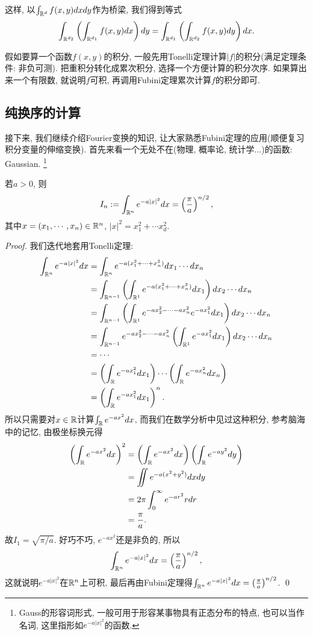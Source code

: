 这样, 以$\int_{\mathbb{R}^d} f(x,y) dxdy$作为桥梁, 我们得到等式
$$\int_{\mathbb{R}^{d_2}} \left(\int_{\mathbb{R}^{d_1}}f(x,y)dx\right)dy
  =\int_{\mathbb{R}^{d_1}} \left(\int_{\mathbb{R}^{d_2}}f(x,y)dy\right)dx.$$
\begin{remark}
    假如要算一个函数$f(x,y)$的积分, 一般先用Tonelli定理计算$|f|$的积分(满足定理条件: 非负可测).
    把重积分转化成累次积分, 选择一个方便计算的积分次序. 
    如果算出来一个有限数, 就说明$f$可积, 再调用Fubini定理累次计算$f$的积分即可.
\end{remark}

\subsection{纯换序的计算}
接下来, 我们继续介绍Fourier变换的知识, 让大家熟悉Fubini定理的应用(顺便复习积分变量的伸缩变换). 首先来看一个无处不在(物理, 概率论, 统计学...)的函数: Gaussian.
\footnote{Gauss的形容词形式, 一般可用于形容某事物具有正态分布的特点, 也可以当作名词, 这里指形如$e^{-a|x|^2}$的函数.}
\begin{example}[~(Gaussian)]
    若$a>0$, 则
    $$I_n := \int_{\mathbb{R}^n}e^{-a|x|^2}dx = \left(\frac{\pi}{a}\right)^{n/2},$$
    其中$x=(x_1, \cdots, x_n) \in \mathbb{R}^n$, $|x|^2 = x_1^2 + \cdots x_d^2$.
\end{example}
\begin{proof}
    我们迭代地套用Tonelli定理:
    \begin{align*}
    \int_{\mathbb{R}^n}e^{-a|x|^2}dx 
    &= \int_{\mathbb{R}^n}e^{-a(x_1^2+\cdots+x_n^2)} dx_1 \cdots dx_n \\
    &= \int_{\mathbb{R}^{n-1}}\left(\int_{\mathbb{R}^1}e^{-a(x_1^2+\cdots+x_n^2)}dx_1 \right)dx_2 \cdots dx_n \\
    &= \int_{\mathbb{R}^{n-1}}\left(\int_{\mathbb{R}^1}e^{-ax_2^2-\cdots-ax_n^2}e^{-ax_1^2}dx_1\right) 
       dx_2 \cdots dx_n \\
    &= \int_{\mathbb{R}^{n-1}}e^{-ax_2^2-\cdots-ax_n^2} \left(\int_{\mathbb{R}^1}e^{-ax_1^2}dx_1\right) 
       dx_2 \cdots dx_n \\
    &= \cdots \\
    &= \left(\int_{\mathbb{R}} e^{-ax_1^2}dx_1\right) \cdots \left(\int_{\mathbb{R}} e^{-ax_n^2}dx_n\right) \\
    &= \left(\int_{\mathbb{R}} e^{-ax_1^2}dx_1\right)^n.
    \end{align*}
    所以只需要对$x \in \mathbb{R}$计算$\int_{\mathbb{R}} e^{-ax^2}dx$, 而我们在数学分析中见过这种积分, 参考脑海中的记忆, 由极坐标换元得
    \begin{align*}
    \left(\int_{\mathbb{R}} e^{-ax^2}dx\right)^2
    &= \left(\int_{\mathbb{R}} e^{-ax^2}dx\right)\left(\int_{\mathbb{R}} e^{-ay^2}dy\right) \\
    &= \iint e^{-a(x^2+y^2)} dxdy \\
    &= 2\pi \int_0^\infty e^{-ar^2}r dr \\
    &= \frac{\pi}{a}. 
    \end{align*}
    故$I_1=\sqrt{\pi/a}$. 好巧不巧, $e^{-ax^2}$还是非负的, 所以
    $$\int_{\mathbb{R}^n}e^{-a|x|^2}dx = \left(\frac{\pi}{a}\right)^{n/2},$$
    这就说明$e^{-a|x|^2}$在$\mathbb{R}^n$上可积, 最后再由Fubini定理得$\int_{\mathbb{R}^n}e^{-a|x|^2}dx = \left(\frac{\pi}{a}\right)^{n/2}$.
    \qed 
\end{proof}

